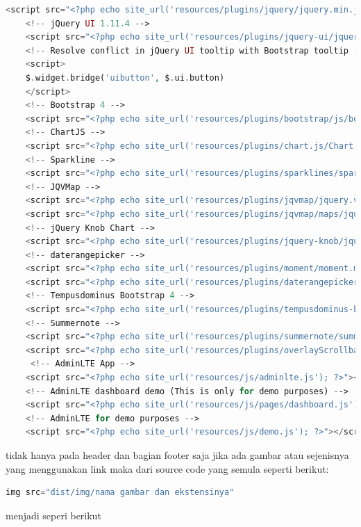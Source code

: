 \begin{lstlisting}[language=PHP]
	<script src="<?php echo site_url('resources/plugins/jquery/jquery.min.js'); ?>"></script>  
	<!-- jQuery UI 1.11.4 -->  
	<script src="<?php echo site_url('resources/plugins/jquery-ui/jquery-ui.min.js'); ?>"></script>  
	<!-- Resolve conflict in jQuery UI tooltip with Bootstrap tooltip -->  
	<script>  
	$.widget.bridge('uibutton', $.ui.button)  
	</script>  
	<!-- Bootstrap 4 -->  
	<script src="<?php echo site_url('resources/plugins/bootstrap/js/bootstrap.bundle.min.js'); ?>"></script>  
	<!-- ChartJS -->  
	<script src="<?php echo site_url('resources/plugins/chart.js/Chart.min.js'); ?>"></script>  
	<!-- Sparkline -->  
	<script src="<?php echo site_url('resources/plugins/sparklines/sparkline.js'); ?>"></script>  
	<!-- JQVMap -->  
	<script src="<?php echo site_url('resources/plugins/jqvmap/jquery.vmap.min.js'); ?>"></script>  
	<script src="<?php echo site_url('resources/plugins/jqvmap/maps/jquery.vmap.usa.js'); ?>"></script>  
	<!-- jQuery Knob Chart -->  
	<script src="<?php echo site_url('resources/plugins/jquery-knob/jquery.knob.min.js'); ?>"></script>  
	<!-- daterangepicker -->  
	<script src="<?php echo site_url('resources/plugins/moment/moment.min.js'); ?>"></script>  
	<script src="<?php echo site_url('resources/plugins/daterangepicker/daterangepicker.js'); ?>"></script>  
	<!-- Tempusdominus Bootstrap 4 -->  
	<script src="<?php echo site_url('resources/plugins/tempusdominus-bootstrap-4/js/tempusdominus-bootstrap-4.min.js'); ?>"></script>  
	<!-- Summernote -->  
	<script src="<?php echo site_url('resources/plugins/summernote/summernote-bs4.min.js'); ?>"></script>  <!-- overlayScrollbars -->  
	<script src="<?php echo site_url('resources/plugins/overlayScrollbars/js/jquery.overlayScrollbars.min.js'); ?>"></script>  
	 <!-- AdminLTE App -->  
	<script src="<?php echo site_url('resources/js/adminlte.js'); ?>"></script>  
	<!-- AdminLTE dashboard demo (This is only for demo purposes) -->  
	<script src="<?php echo site_url('resources/js/pages/dashboard.js'); ?>"></script>  
	<!-- AdminLTE for demo purposes -->  
	<script src="<?php echo site_url('resources/js/demo.js'); ?>"></script> 

\end{lstlisting}
tidak hanya pada header dan bagian footer saja jika ada gambar atau sejenisnya yang menggunakan link maka dari source code yang semula seperti berikut:
\begin{lstlisting}[language=PHP]
img src="dist/img/nama gambar dan ekstensinya"  
\end{lstlisting}
menjadi seperi berikut

